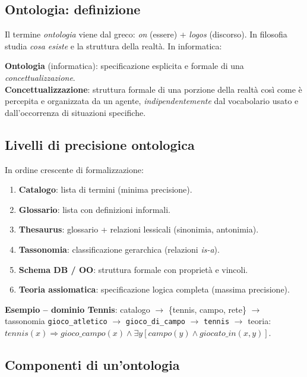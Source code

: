 \documentclass[12pt,a4paper]{article}
\begin{document}
\subsection{Ontologia: definizione}

Il termine \emph{ontologia} viene dal greco: \textit{on} (essere) + \textit{logos} (discorso). In filosofia studia \emph{cosa esiste} e la struttura della realtà. In informatica:

\begin{defbox}
\textbf{Ontologia} (informatica): specificazione esplicita e formale di una \emph{concettualizzazione}.\\[4pt]
\textbf{Concettualizzazione}: struttura formale di una porzione della realtà così come è percepita e organizzata da un agente, \emph{indipendentemente} dal vocabolario usato e dall'occorrenza di situazioni specifiche.
\end{defbox}

\subsection{Livelli di precisione ontologica}

In ordine crescente di formalizzazione:

\begin{enumerate}[leftmargin=1.5em, label=\arabic*.]
  \item \textbf{Catalogo}: lista di termini (minima precisione).
  \item \textbf{Glossario}: lista con definizioni informali.
  \item \textbf{Thesaurus}: glossario + relazioni lessicali (sinonimia, antonimia).
  \item \textbf{Tassonomia}: classificazione gerarchica (relazioni \emph{is-a}).
  \item \textbf{Schema DB / OO}: struttura formale con proprietà e vincoli.
  \item \textbf{Teoria assiomatica}: specificazione logica completa (massima precisione).
\end{enumerate}

\textbf{Esempio -- dominio Tennis}: catalogo $\to$ \{tennis, campo, rete\} $\to$ tassonomia \texttt{gioco\_atletico} $\to$ \texttt{gioco\_di\_campo} $\to$ \texttt{tennis} $\to$ teoria: $\mathit{tennis}(x) \Rightarrow \mathit{gioco\_campo}(x) \wedge \exists y[\mathit{campo}(y) \wedge \mathit{giocato\_in}(x,y)]$.

\subsection{Componenti di un'ontologia}
\end{document}
